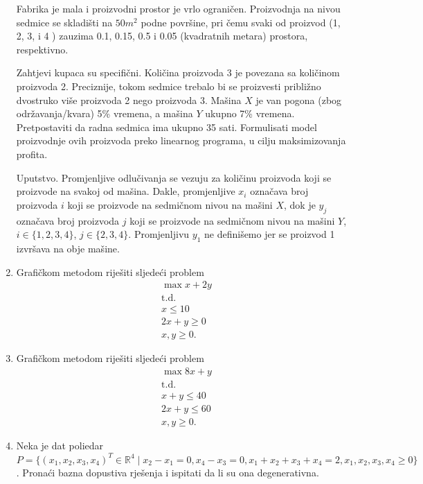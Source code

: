 \documentclass[b5paper, utf8, 11pt, colorlinks]{book}
\theoremstyle{definition}
\begin{document}
\begin{enumerate}
Fabrika je  mala i proizvodni prostor je vrlo ograničen. Proizvodnja na nivou sedmice se skladišti na $50 m^2$ podne površine, pri čemu svaki od proizvod (1, 2, 3, i 4 ) zauzima 0.1, 0.15, 0.5 i 0.05 (kvadratnih metara) prostora,  respektivno. 

Zahtjevi kupaca su specifični. Količina proizvoda 3 je povezana sa količinom  proizvoda 2. Preciznije, tokom sedmice trebalo bi se proizvesti približno dvostruko više  proizvoda 2 nego proizvoda 3. Mašina $X$ je van pogona (zbog održavanja/kvara) 5\% vremena, a mašina $Y$ ukupno 7\% vremena.
Pretpostaviti da radna sedmica ima ukupno 35 sati. Formulisati model proizvodnje ovih proizvoda preko linearnog programa, u cilju maksimizovanja profita. 

Uputstvo. Promjenljive odlučivanja se vezuju za količinu proizvoda koji se proizvode na svakoj od mašina.  Dakle, 
promjenljive $x_i$ označava broj proizvoda $i$ koji se proizvode na sedmičnom nivou na mašini $X$, dok je $y_j$ označava  broj proizvoda $j$ koji se proizvode na sedmičnom nivou na mašini $Y$, $i \in \{1,2,3,4\}$, $j \in \{2,3,4\}$. Promjenljivu $y_1$ ne definišemo jer se proizvod 1 izvršava na obje mašine.  

	\item Grafičkom metodom riješiti sljedeći problem
	\begin{align*}
		&\max   x + 2 y \\
		& \mbox{t.d.} \\
		& x \leq 10 \\
		& 2 x + y\geq 0 \\
		& x,y \geq 0.
	\end{align*}
	\item Grafičkom metodom riješiti sljedeći problem 
	\begin{align*}
		& \max  8 x + y \\
		& \mbox{t.d.} \\
		&  x + y \leq 40 \\
		& 2x + y \leq 60 \\
		& x,y \geq 0.
	\end{align*}

\item Neka je dat poliedar $P= \{ (x_1,x_2,x_3, x_4)^T \in \mathbb{R}^4 \mid x_2 - x_1 = 0, x_4 - x_3 = 0,  x_1 + x_2 +   x_3 + x_4 = 2, x_1,x_2,x_3, x_4 \geq 0 \}$.  Pronaći bazna dopustiva rješenja i ispitati da li su ona degenerativna.  
\end{enumerate}
\end{document}
